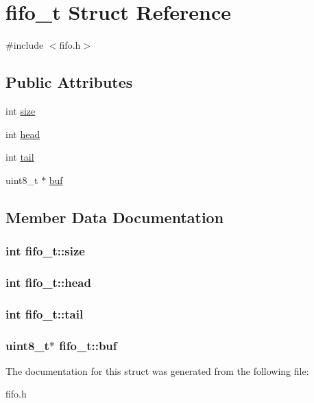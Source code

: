 \hypertarget{structfifo__t}{\section{fifo\-\_\-t Struct Reference}
\label{structfifo__t}
}


{\ttfamily \#include $<$fifo.\-h$>$}

\subsection*{Public Attributes}
\begin{DoxyCompactItemize}
\item 
int \hyperlink{structfifo__t_adfe58cd24e80a0d62cf830bcc83f5c01}{size}
\item 
int \hyperlink{structfifo__t_ae93028e986799fceacecbd153729f855}{head}
\item 
int \hyperlink{structfifo__t_abe914ae9dd92644d8a53a4b99d89b487}{tail}
\item 
uint8\-\_\-t $\ast$ \hyperlink{structfifo__t_a6179dabda649717df17b5a38dbf0d744}{buf}
\end{DoxyCompactItemize}


\subsection{Member Data Documentation}
\hypertarget{structfifo__t_adfe58cd24e80a0d62cf830bcc83f5c01}{
\subsubsection[{size}]{\setlength{\rightskip}{0pt plus 5cm}int fifo\-\_\-t\-::size}}\label{structfifo__t_adfe58cd24e80a0d62cf830bcc83f5c01}
\hypertarget{structfifo__t_ae93028e986799fceacecbd153729f855}{
\subsubsection[{head}]{\setlength{\rightskip}{0pt plus 5cm}int fifo\-\_\-t\-::head}}\label{structfifo__t_ae93028e986799fceacecbd153729f855}
\hypertarget{structfifo__t_abe914ae9dd92644d8a53a4b99d89b487}{
\subsubsection[{tail}]{\setlength{\rightskip}{0pt plus 5cm}int fifo\-\_\-t\-::tail}}\label{structfifo__t_abe914ae9dd92644d8a53a4b99d89b487}
\hypertarget{structfifo__t_a6179dabda649717df17b5a38dbf0d744}{
\subsubsection[{buf}]{\setlength{\rightskip}{0pt plus 5cm}uint8\-\_\-t$\ast$ fifo\-\_\-t\-::buf}}\label{structfifo__t_a6179dabda649717df17b5a38dbf0d744}


The documentation for this struct was generated from the following file\-:\begin{DoxyCompactItemize}
\item 
fifo.\-h\end{DoxyCompactItemize}
